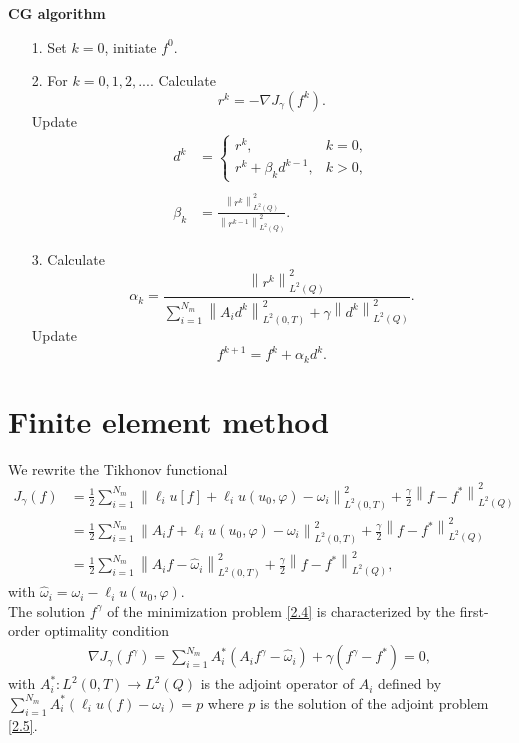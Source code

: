 \documentclass[]{article}
\begin{document}
\noindent \textbf{CG algorithm}
\begin{itemize}
	\item[1.] Set $k=0$, initiate $f^0$.
	\item[2.] For $k=0, 1, 2,...$. Calculate
	$$r^k=-\nabla J_\gamma(f^k).$$
	Update\\
	\begin{align*}
		d^k&=\left\{\begin{array}{ll}
		r^k,& k=0,\\
		r^k+\beta_kd^{k-1},& k>0,
		\end{array}\right.\\\\
		\beta_k&=\frac{\left\|r^k\right\|^2_{L^2(Q)}}{\left\|r^{k-1}\right\|^2_{L^2(Q)}}.
	\end{align*}
	\item[3.] Calculate
	$$\alpha_k=\frac{\left\|r^k\right\|^2_{L^2(Q)}}{\sum_{i=1}^{N_m}\left\|A_id^k\right\|^2_{L^2(0, T)}+\gamma\left\|d^k\right\|^2_{L^2(Q)}}.$$
	Update
	$$f^{k+1}=f^{k}+\alpha_kd^k.$$
\end{itemize}

\section{Finite element method}
We rewrite the Tikhonov functional
\begin{align*}
	J_\gamma(f)&=\frac{1}{2}\sum_{i=1}^{N_m}\left\|\ell_i u[f]+\ell_i u(u_0, \varphi)-\omega_i\right\|^2_{L^2(0, T)}+\frac{\gamma}{2}\left\|f-f^*\right\|^2_{L^2(Q)}\\
	&=\frac{1}{2}\sum_{i=1}^{N_m}\left\|A_if+\ell_i u(u_0, \varphi)-\omega_i\right\|^2_{L^2(0, T)}+\frac{\gamma}{2}\left\|f-f^*\right\|^2_{L^2(Q)}\\
	&=\frac{1}{2}\sum_{i=1}^{N_m}\left\|A_if-\hat{\omega}_i\right\|^2_{L^2(0, T)}+\frac{\gamma}{2}\left\|f-f^*\right\|^2_{L^2(Q)},
\end{align*}
with $\hat{\omega}_i=\omega_i-\ell_i u(u_0, \varphi)$.
\\
The solution $f^\gamma$ of the minimization problem \eqref{2.4} is characterized by the first-order optimality condition
\begin{align}\label{3.1}
	\nabla J_\gamma(f^\gamma)= \sum_{i=1}^{N_m}A^*_i(A_if^\gamma-\hat{\omega}_i)+\gamma(f^\gamma-f^*)=0,
\end{align}
with $A_i^*: L^2(0, T)\to L^2(Q)$ is the adjoint operator of $A_i$ defined by $\sum_{i=1}^{N_m}A_i^*\left(\ell_i u(f) - \omega_i\right) = p$ where $p$ is the solution of the adjoint problem \eqref{2.5}. 
\end{document}
